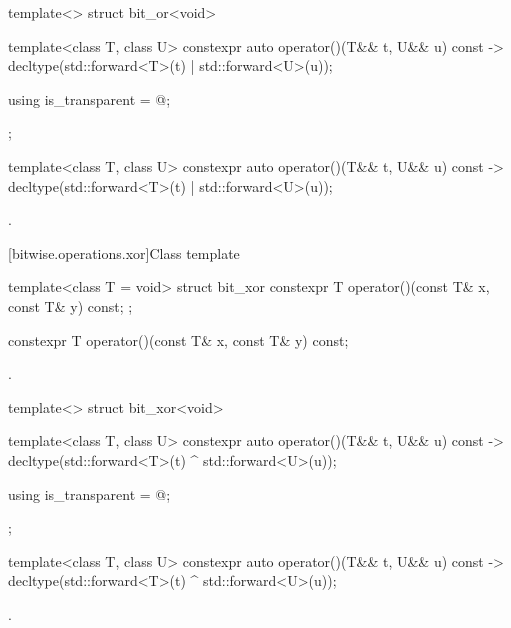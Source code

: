 %
\begin{itemdecl}
template<> struct bit_or<void> {
  template<class T, class U> constexpr auto operator()(T&& t, U&& u) const
    -> decltype(std::forward<T>(t) | std::forward<U>(u));

  using is_transparent = @\unspec@;
};
\end{itemdecl}

%
\begin{itemdecl}
template<class T, class U> constexpr auto operator()(T&& t, U&& u) const
    -> decltype(std::forward<T>(t) | std::forward<U>(u));
\end{itemdecl}

\begin{itemdescr}
\pnum
\returns
{}.
\end{itemdescr}

[bitwise.operations.xor]{Class template }

%
\begin{itemdecl}
template<class T = void> struct bit_xor {
  constexpr T operator()(const T& x, const T& y) const;
};
\end{itemdecl}

%
\begin{itemdecl}
constexpr T operator()(const T& x, const T& y) const;
\end{itemdecl}

\begin{itemdescr}
\pnum
\returns
{}.
\end{itemdescr}

%
\begin{itemdecl}
template<> struct bit_xor<void> {
  template<class T, class U> constexpr auto operator()(T&& t, U&& u) const
    -> decltype(std::forward<T>(t) ^ std::forward<U>(u));

  using is_transparent = @\unspec@;
};
\end{itemdecl}

%
\begin{itemdecl}
template<class T, class U> constexpr auto operator()(T&& t, U&& u) const
    -> decltype(std::forward<T>(t) ^ std::forward<U>(u));
\end{itemdecl}

\begin{itemdescr}
\pnum
\returns
{}.
\end{itemdescr}

